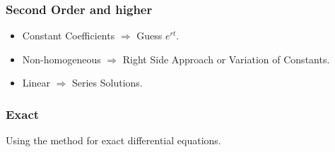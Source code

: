\subsubsection{Second Order and higher}

\begin{itemize}[label=\(-\)]
    \item Constant Coefficients \(\Rightarrow\) Guess \(e^{rt}\).
    \item Non-homogeneous \(\Rightarrow\) Right Side Approach or Variation of Constants.
    \item Linear \(\Rightarrow\) Series Solutions.
\end{itemize}

\subsubsection{Exact}

Using the method for exact differential equations.



